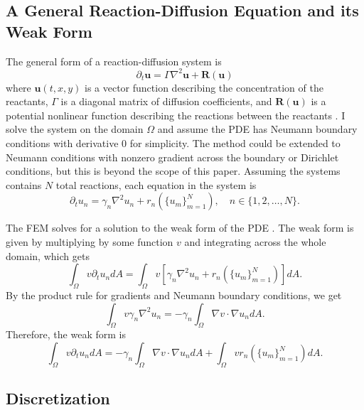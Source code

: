 \subsection{A General Reaction-Diffusion Equation and its Weak Form}

The general form of a reaction-diffusion system is
\[
    \partial_t \mathbf{u} = \Gamma \nabla^2 \mathbf{u} + \mathbf{R} (\mathbf{u})
\]
where $\mathbf{u}(t, x, y)$ is a vector function describing the concentration of the reactants, $\Gamma$ is a diagonal matrix of diffusion coefficients, and $\mathbf{R}(\mathbf{u})$ is a potential nonlinear function describing the reactions between the reactants \parencite{martin1992nonlinear}. I solve the system on the domain $\Omega$ and assume the PDE has Neumann boundary conditions with derivative 0 for simplicity. The method could be extended to Neumann conditions with nonzero gradient across the boundary or Dirichlet conditions, but this is beyond the scope of this paper. Assuming the systems contains $N$ total reactions, each equation in the system is
\[
    \partial_t u_n = \gamma_n \nabla^2 u_n + r_n\left(\{u_m\}_{m = 1}^{N}\right), \quad n \in \{1, 2, \dots, N\}.
\]

The FEM solves for a solution to the weak form of the PDE \autocite{galerkin1968rods}. The weak form is given by multiplying by some function $v$ and integrating across the whole domain, which gets
\[
    \int_\Omega v \partial_t u_n dA = \int_\Omega v \left[ \gamma_n \nabla^2 u_n + r_n\left(\{u_m\}_{m = 1}^{N}\right)\right] dA.
\]
By the product rule for gradients and Neumann boundary conditions, we get
\[
    \int_\Omega v \gamma_n \nabla^2 u_n = -\gamma_n \int_\Omega \nabla v \cdot \nabla u_n dA.
\]
Therefore, the weak form is
\[
    \int_\Omega v \partial_t u_n dA = -\gamma_n \int_\Omega \nabla v \cdot \nabla u_n dA + \int_\Omega v r_n\left(\{u_m\}_{m = 1}^{N}\right) dA.
\]


\subsection{Discretization}

